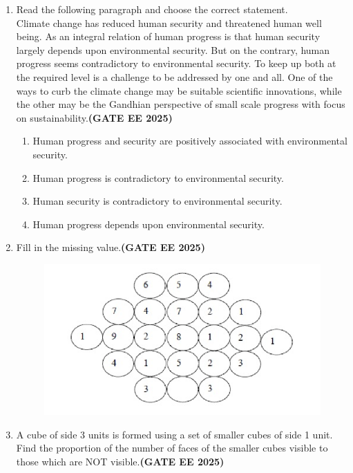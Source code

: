 \documentclass[journal,12pt,onecolumn]{IEEEtran}
\theoremstyle{remark}
\begin{document}
\begin{enumerate}
\item Read the following paragraph and choose the correct statement.
\\
Climate change has reduced human security and threatened human well being. As an integral relation of human progress is that human security largely depends upon environmental security. But on the contrary, human progress seems contradictory to environmental security. To keep up both at the required level is a challenge to be addressed by one and all. One of the ways to curb the climate change may be suitable scientific innovations, while the other may be the Gandhian perspective of small scale progress with focus on sustainability.\hfill \textbf{(GATE EE 2025)}
\begin{enumerate}
    \item Human progress and security are positively associated with environmental security.
    \item Human progress is contradictory to environmental security.
    \item Human security is contradictory to environmental security.
    \item Human progress depends upon environmental security.
\end{enumerate}






\item Fill in the missing value.\hfill \textbf{(GATE EE 2025)}

\begin{figure}[h]
    \centering
    \includegraphics[width=0.5\linewidth]{figs/fig1.png}
    \caption{}
    \label{fig1}
\end{figure}


\item A cube of side 3 units is formed using a set of smaller cubes of side 1 unit. Find the proportion of the number of faces of the smaller cubes visible to those which are NOT visible.\hfill \textbf{(GATE EE 2025)}
\begin{enumerate}
\end{enumerate}




\end{enumerate}
\end{document}
